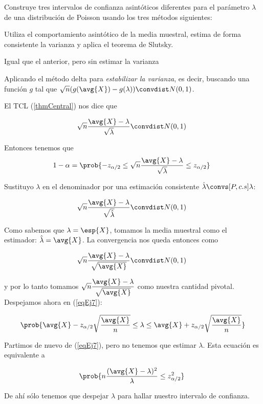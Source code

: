 \begin{problem}[7]
Construye tres intervalos de confianza asintóticos diferentes para el parámetro $\lambda$ de una distribución de Poisson usando los tres métodos siguientes:

\ppart Utiliza el comportamiento asintótico de la media muestral, estima de forma consistente la varianza y aplica el teorema de Slutsky.

\ppart Igual que el anterior, pero sin estimar la varianza

\ppart Aplicando el método delta para \textit{estabilizar la varianza}, es decir, buscando una función $g$ tal que $\sqrt{n}(g(\avg{X}) - g(\lambda))\convdist N(0,1)$.

\solution

\spart El TCL (\ref{thmCentral}) nos dice que

\[ \sqrt{n}\frac{\avg{X} - \lambda}{\sqrt{\lambda}} \convdist N(0,1) \]

Entonces tenemos que 
\begin{equation}
 1-\alpha = \prob{-z_{\alpha/2}\leq\sqrt{n}\frac{\avg{X} - \lambda}{\sqrt{\lambda}} \leq z_{\alpha/2}} \label{eqEj7}
 \end{equation}

Sustituyo $\lambda$ en el denominador por una estimación consistente $\hat{\lambda}\convs[P, c.s]\lambda$:

\[ \sqrt{n}\frac{\avg{X} - \lambda}{\sqrt{\hat{\lambda}}} \convdist N(0,1) \]

Como sabemos que $\lambda = \esp{X}$, tomamos la media muestral como el estimador: $\hat{\lambda} = \avg{X}$. La convergencia nos queda entonces como


\[ \sqrt{n}\frac{\avg{X} - \lambda}{\sqrt{\avg{X}}} \convdist N(0,1) \]

y por lo tanto tomamos $ \sqrt{n}\dfrac{\avg{X} - \lambda}{\sqrt{\avg{X}}}$ como nuestra cantidad pivotal. Despejamos ahora en (\ref{eqEj7}):

\[ \prob{\avg{X} - z_{\alpha/2} \sqrt{\frac{\avg{X}}{n}} 
	\leq \lambda
	\leq \avg{X} + z_{\alpha/2} \sqrt{\frac{\avg{X}}{n}}}
	\]

\spart Partimos de nuevo de (\ref{eqEj7}), pero no tenemos que estimar $\lambda$. Esta ecuación es equivalente a 

\[ \prob{n\frac{(\avg{X}-\lambda)^2}{\lambda} \leq z_{\alpha/2}^2} \]

De ahí sólo tenemos que despejar $\lambda$ para hallar nuestro intervalo de confianza.


\end{problem}
